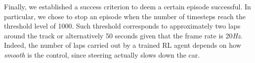 Finally, we established a success criterion to deem a certain episode successful. In particular, we chose to stop an episode when the number of timesteps reach the threshold level of 1000. Such threshold corresponds to approximately two laps around the track or alternatively 50 seconds given that the frame rate is 20\textit{Hz}. Indeed, the number of laps carried out by a trained RL agent depends on how \textit{smooth} is the control, since steering actually slows down the car.

%
%
%

